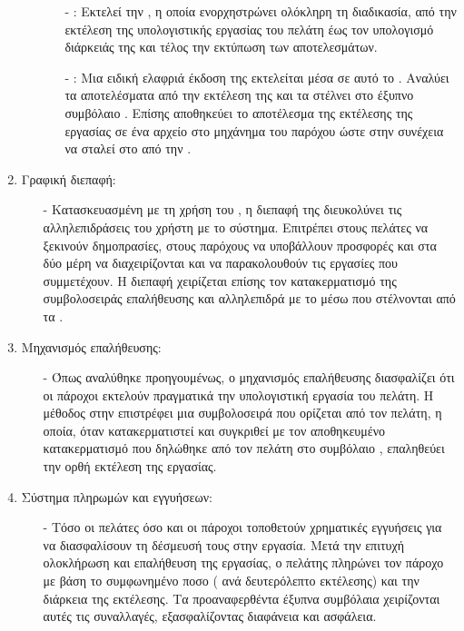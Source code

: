 \begin{enumerate}
\begin{itemize}
        \begin{itemize}
            \item[-] : Εκτελεί την , η οποία ενορχηστρώνει ολόκληρη τη διαδικασία, από την εκτέλεση της υπολογιστικής εργασίας του πελάτη έως τον υπολογισμό διάρκειάς της και τέλος την εκτύπωση των αποτελεσμάτων.
            \item[-] : Μια ειδική ελαφριά έκδοση της  εκτελείται μέσα σε αυτό το . Αναλύει τα αποτελέσματα από την εκτέλεση της  και τα στέλνει στο έξυπνο συμβόλαιο . Επίσης αποθηκεύει το αποτέλεσμα της εκτέλεσης της εργασίας σε ένα αρχείο στο μηχάνημα του παρόχου ώστε στην συνέχεια να σταλεί στο  από την .
        \end{itemize}
    \end{itemize}
    \item Γραφική διεπαφή:
        \begin{itemize}
            \item[-] Κατασκευασμένη με τη χρήση του , η διεπαφή της  διευκολύνει τις αλληλεπιδράσεις του χρήστη με το σύστημα. Επιτρέπει στους πελάτες να ξεκινούν δημοπρασίες, στους παρόχους να υποβάλλουν προσφορές και στα δύο μέρη να διαχειρίζονται και να παρακολουθούν τις εργασίες που συμμετέχουν. Η διεπαφή χειρίζεται επίσης τον κατακερματισμό της συμβολοσειράς επαλήθευσης και αλληλεπιδρά με το  μέσω  που στέλνονται από τα . 
        \end{itemize}
    \item Μηχανισμός επαλήθευσης:
     \begin{itemize}
        \item[-] Όπως αναλύθηκε προηγουμένως, ο μηχανισμός επαλήθευσης διασφαλίζει ότι οι πάροχοι εκτελούν πραγματικά την υπολογιστική εργασία του πελάτη. Η μέθοδος  στην  επιστρέφει μια συμβολοσειρά που ορίζεται από τον πελάτη, η οποία, όταν κατακερματιστεί και συγκριθεί με τον αποθηκευμένο κατακερματισμό που δηλώθηκε από τον πελάτη στο συμβόλαιο , επαληθεύει την ορθή εκτέλεση της εργασίας.
     \end{itemize}
    \item Σύστημα πληρωμών και εγγυήσεων: 
    \begin{itemize}
        \item[-] Τόσο οι πελάτες όσο και οι πάροχοι τοποθετούν χρηματικές εγγυήσεις για να διασφαλίσουν τη δέσμευσή τους στην εργασία. Μετά την επιτυχή ολοκλήρωση και επαλήθευση της εργασίας, ο πελάτης πληρώνει τον πάροχο με βάση το συμφωνημένο ποσο ( ανά δευτερόλεπτο εκτέλεσης) και την διάρκεια της εκτέλεσης. Τα προαναφερθέντα έξυπνα συμβόλαια χειρίζονται αυτές τις συναλλαγές, εξασφαλίζοντας διαφάνεια και ασφάλεια.
    \end{itemize}
\end{enumerate}

